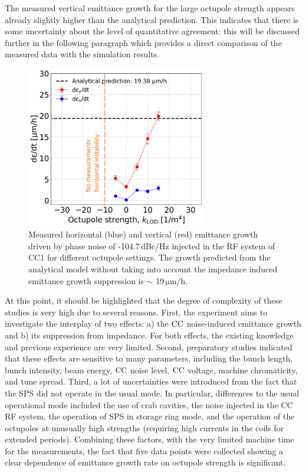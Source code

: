 The measured vertical emittance growth for the large octupole strength appears already slightly higher than the analytical prediction. This indicates that there is some uncertainty about the level of quantitative agreement: this will be discussed further in the following paragraph which provides a direct comparison of the measured data with the simulation results.

\begin{figure}[!h]
   \centering         
   \includegraphics[width=0.7\textwidth]{images/Ch8/emit_H_and_V_octupole_scan_background_growth_subtracted_modified.png}
       \caption{Measured horizontal (blue) and vertical (red) emittance growth driven by phase noise of -104.7\,dBc/Hz injected in the RF system of CC1 for different octupole settings. The growth predicted from the analytical model without taking into account the impedance induced emittance growth suppression is $\sim$ 19\,$\mathrm{\mu m/h}$.}
       \label{fig:H_V_emit_growth_background_subtracted_octupole_scan}
\end{figure}

At this point, it should be highlighted that the degree of complexity of these studies is very high due to several reasons. First, the experiment aims to investigate the interplay of two effects: a) the ${\mathrm{CC}}$ noise-induced emittance growth and b) its suppression from impedance.  For both effects, the existing knowledge and previous experience are very limited. %
Second, preparatory studies indicated that these effects are sensitive to many parameters, including the bunch length, bunch intensity, beam energy, ${\mathrm{CC}}$ noise level, ${\mathrm{CC}}$ voltage, machine chromaticity, and tune spread. Third, a lot of uncertainties were introduced from the fact that the SPS did not operate in the usual mode. In particular, differences to the usual operational mode included the use of crab cavities, the noise injected in the CC RF system, the operation of SPS in storage ring mode, and the operation of the octupoles at unusually high strengths (requiring high currents in the coils for extended periods). %
Combining these factors, with the very limited machine time for the measurements, the fact that five data points were collected showing a clear dependence of emittance growth rate on octupole strength is significant.

